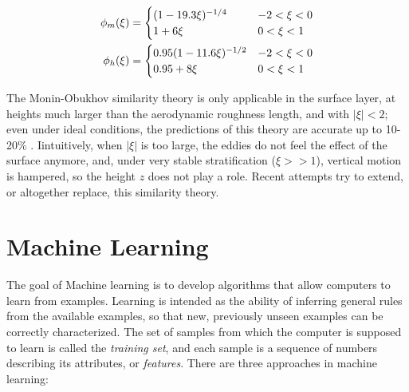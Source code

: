 \documentclass[12pt]{book}
\begin{document}
\begin{align}
\phi_m(\xi)&=\begin{cases}
\label{eq:phi_m_coeff}
\mathrlap{(1-19.3\xi)^{-1/4}} \hphantom{0.95(1-11.6\xi)^{-1/2}} & -2<\xi<0 \\
1+6\xi & 0<\xi<1\\
\end{cases} \\
\phi_h(\xi)&=\begin{cases}
0.95(1-11.6\xi)^{-1/2} & -2<\xi<0 \\
0.95+8\xi & 0<\xi<1
\end{cases}
\end{align}


The Monin-Obukhov similarity theory is only applicable in the surface layer, at heights much larger than the aerodynamic roughness length, and with $\vert\xi\vert<2$; even under ideal conditions, the predictions of this theory are accurate up to 10-20\% \citep{50years}. Iintuitively, when $\vert\xi\vert$ is too large, the eddies do not feel the effect of the surface anymore, and, under very stable stratification ($\xi>>1$), vertical motion is hampered, so the height $z$ does not play a role. Recent attempts \citep{sheba_phim,most_teal,Wilson2008} try to extend, or altogether replace, this similarity theory.

\section{Machine Learning}
\label{sec:ml}
The goal of Machine learning is to develop algorithms that allow computers to learn from examples. Learning is intended as the ability of inferring general rules from the available examples, so that new, previously unseen examples can be correctly characterized. The set of samples from which the computer is supposed to learn is called the \emph{training set}, and each sample is a sequence of numbers describing its attributes, or \emph{features}. There are three approaches in machine learning:
\end{document}
